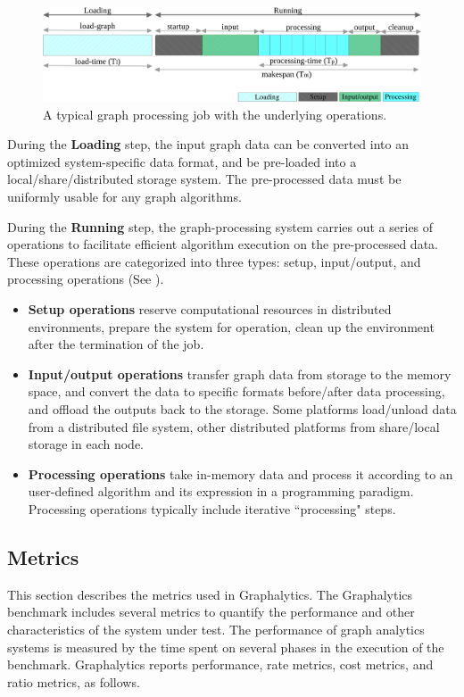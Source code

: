 \begin{figure}[h]
	\centering
	\includegraphics[width=0.9\linewidth]{figures/benchmark-job.pdf}
	\caption{A typical graph processing job with the underlying operations.}
	\label{fig:job}
\end{figure}


During the \textbf{Loading} step, the input graph data can be converted into an optimized system-specific data format, and be pre-loaded into a local/share/distributed storage system. The pre-processed data must be uniformly usable for any graph algorithms.

During the \textbf{Running} step, the graph-processing system carries out a series of operations to facilitate efficient algorithm execution on the pre-processed data. These operations are categorized into three types: setup, input/output, and processing operations (See ).
\begin{itemize}
    \item \textbf{Setup operations} reserve computational resources in distributed environments, prepare the system for operation, clean up the environment after the termination of the job.
    \item \textbf{Input/output operations} transfer graph data from storage to the memory space, and convert the data to specific formats before/after data processing, and offload the outputs back to the storage. Some platforms load/unload data from a distributed file system, other distributed platforms from share/local storage in each node.
    \item \textbf{Processing operations} take in-memory data and process it according to an user-defined algorithm and its expression in a programming paradigm. Processing operations typically include iterative ``processing" steps.
\end{itemize}








\subsection{Metrics} 
\label{sec:def:metrics}
This section describes the metrics used in Graphalytics. The Graphalytics benchmark includes several metrics to quantify the performance and other characteristics of the system under test. The performance of graph analytics systems is measured by the time spent on several phases in the execution of the benchmark. Graphalytics reports performance, rate metrics, cost metrics, and ratio metrics, as follows.



